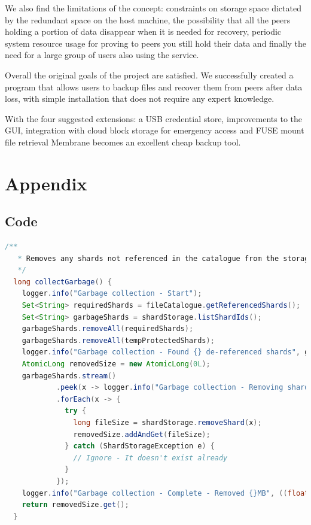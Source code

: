 \documentclass[11pt, a4paper, twoside]{report}
\begin{document}
We also find the limitations of the concept: constraints on storage space dictated by the redundant space on the host machine, the possibility that all the peers holding a portion of data disappear when it is needed for recovery, periodic system resource usage for proving to peers you still hold their data and finally the need for a large group of users also using the service.

Overall the original goals of the project are satisfied. We successfully created a program that allows users to backup files and recover them from peers after data loss, with simple installation that does not require any expert knowledge.

With the four suggested extensions: a USB credential store, improvements to the GUI, integration with cloud block storage for emergency access and FUSE mount file retrieval Membrane becomes an excellent cheap backup tool.



\newpage

\chapter{Appendix}

\section{Code}

\begin{lstlisting}[language=Java, caption=Garbage Collection Implementation, label=lst:fileGC]
  /**
   * Removes any shards not referenced in the catalogue from the storage.
   */
  long collectGarbage() {
    logger.info("Garbage collection - Start");
    Set<String> requiredShards = fileCatalogue.getReferencedShards();
    Set<String> garbageShards = shardStorage.listShardIds();
    garbageShards.removeAll(requiredShards);
    garbageShards.removeAll(tempProtectedShards);
    logger.info("Garbage collection - Found {} de-referenced shards", garbageShards.size());
    AtomicLong removedSize = new AtomicLong(0L);
    garbageShards.stream()
            .peek(x -> logger.info("Garbage collection - Removing shard: [{}]", x))
            .forEach(x -> {
              try {
                long fileSize = shardStorage.removeShard(x);
                removedSize.addAndGet(fileSize);
              } catch (ShardStorageException e) {
                // Ignore - It doesn't exist already
              }
            });
    logger.info("Garbage collection - Complete - Removed {}MB", ((float) removedSize.get()) / (1024 * 1024));
    return removedSize.get();
  }
\end{lstlisting}
\end{document}
